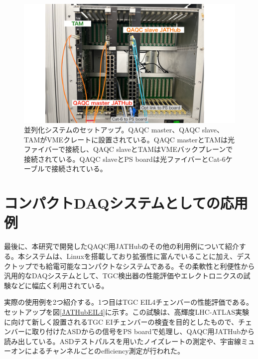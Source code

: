 
\begin{figure} 
\centering
\includegraphics[width=16cm]{fig/QAQC/QAQCpararellpicture.pdf}
\caption[並列化システムのセットアップ]{並列化システムのセットアップ。QAQC master、QAQC slave、TAMがVMEクレートに設置されている。QAQC masterとTAMは光ファイバーで接続し、QAQC slaveとTAMはVMEバックプレーンで接続されている。QAQC slaveとPS boardは光ファイバーとCat-6ケーブルで接続されている。}
\label{QAQCpararellpicture}
\end{figure}

\section{コンパクトDAQシステムとしての応用例}
\label{sec_compactdaq}
最後に、本研究で開発したQAQC用JATHubのその他の利用例について紹介する。本システムは、Linuxを搭載しており拡張性に富んでいることに加え、デスクトップでも給電可能なコンパクトなシステムである。その柔軟性と利便性から汎用的なDAQシステムとして、TGC検出器の性能評価やエレクトロニクスの試験などに幅広く利用されている。

実際の使用例を2つ紹介する。1つ目はTGC EIL4チェンバーの性能評価である。セットアップを図\ref{JATHubEIL4}に示す。この試験は、高輝度LHC-ATLAS実験に向けて新しく設置されるTGC EIチェンバーの検査を目的としたもので、チェンバーに取り付けたASDからの信号をPS boardで処理し、QAQC用JATHubから読み出している。ASDテストパルスを用いたノイズレートの測定や、宇宙線ミューオンによるチャンネルごとのefficiency測定が行われた。

